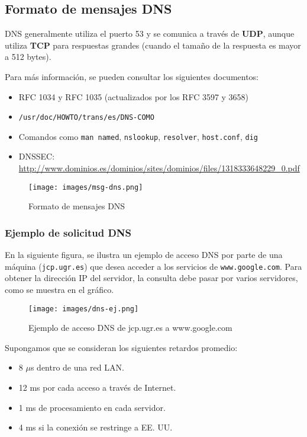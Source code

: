 \documentclass[a4paper,12pt]{article}
\begin{document}
\subsection{Formato de mensajes DNS}

DNS generalmente utiliza el puerto 53 y se comunica a través de \textbf{UDP}, aunque utiliza \textbf{TCP} para respuestas grandes (cuando el tamaño de la respuesta es mayor a 512 bytes). 

Para más información, se pueden consultar los siguientes documentos:

\begin{itemize}
    \item RFC 1034 y RFC 1035 (actualizados por los RFC 3597 y 3658)
    \item \texttt{/usr/doc/HOWTO/trans/es/DNS-COMO}
    \item Comandos como \texttt{man named}, \texttt{nslookup}, \texttt{resolver}, \texttt{host.conf}, \texttt{dig}
    \item DNSSEC: \url{http://www.dominios.es/dominios/sites/dominios/files/1318333648229_0.pdf}
\end{itemize}

\begin{figure}[H]
    \centering
    \texttt{[image: images/msg-dns.png]}
    \caption{Formato de mensajes DNS}
\end{figure}

\subsubsection{Ejemplo de solicitud DNS}

En la siguiente figura, se ilustra un ejemplo de acceso DNS por parte de una máquina (\texttt{jcp.ugr.es}) que desea acceder a los servicios de \texttt{www.google.com}. Para obtener la dirección IP del servidor, la consulta debe pasar por varios servidores, como se muestra en el gráfico.

\begin{figure}[H]
    \centering
    \texttt{[image: images/dns-ej.png]}
    \caption{Ejemplo de acceso DNS de jcp.ugr.es a www.google.com}
\end{figure}

Supongamos que se consideran los siguientes retardos promedio:
\begin{itemize}
    \item 8 $\mu$s dentro de una red LAN.
    \item 12 ms por cada acceso a través de Internet.
    \item 1 ms de procesamiento en cada servidor.
    \item 4 ms si la conexión se restringe a EE. UU.
\end{itemize}
\end{document}
